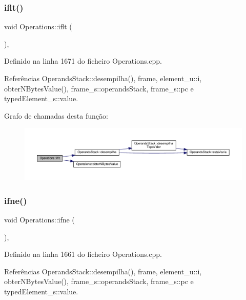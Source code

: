 \subsubsection{\texorpdfstring{iflt()}{iflt()}}
{\footnotesize\ttfamily void Operations\+::iflt (\begin{DoxyParamCaption}{ }\end{DoxyParamCaption})\hspace{0.3cm}{\ttfamily [static]}, {\ttfamily [private]}}



Definido na linha 1671 do ficheiro Operations.\+cpp.



Referências Operands\+Stack\+::desempilha(), frame, element\+\_\+u\+::i, obter\+N\+Bytes\+Value(), frame\+\_\+s\+::operands\+Stack, frame\+\_\+s\+::pc e typed\+Element\+\_\+s\+::value.

Grafo de chamadas desta função\+:
\nopagebreak
\begin{figure}[H]
\begin{center}
\leavevmode
\includegraphics[width=350pt]{classOperations_a0a9460ea938fc3a9bbd2102578d50ee2_cgraph}
\end{center}
\end{figure}
\mbox{\label{classOperations_aaadc2a6aaf1d3be06e918930622dad29}} 
\subsubsection{\texorpdfstring{ifne()}{ifne()}}
{\footnotesize\ttfamily void Operations\+::ifne (\begin{DoxyParamCaption}{ }\end{DoxyParamCaption})\hspace{0.3cm}{\ttfamily [static]}, {\ttfamily [private]}}



Definido na linha 1661 do ficheiro Operations.\+cpp.



Referências Operands\+Stack\+::desempilha(), frame, element\+\_\+u\+::i, obter\+N\+Bytes\+Value(), frame\+\_\+s\+::operands\+Stack, frame\+\_\+s\+::pc e typed\+Element\+\_\+s\+::value.

